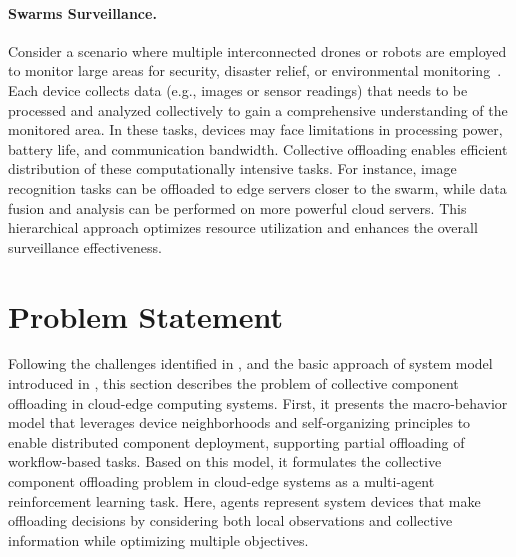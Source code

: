 \paragraph{Swarms Surveillance.} 
Consider a scenario where multiple interconnected drones 
 or robots are employed to monitor large areas for security,
 disaster relief, or environmental monitoring~\cite{DBLP:journals/trob/ChungPDSK18a}.
%
Each device collects data (e.g., images or sensor readings) that needs to be processed 
 and analyzed collectively to gain a comprehensive understanding of the monitored area.
%
In these tasks,
 devices may face limitations in processing power,
 battery life, and communication bandwidth.
%
Collective offloading enables efficient distribution of these computationally intensive tasks.
% 
For instance,
 image recognition tasks can be offloaded to edge servers closer to the swarm, 
 while data fusion and analysis can be performed on more powerful cloud servers.
%
This hierarchical approach optimizes resource utilization 
 and enhances the overall surveillance effectiveness.


\section{Problem Statement}\label{sec:problem-statement}

Following the challenges identified in , 
 and the basic approach of system model introduced in \cite{acsos-model}, 
 this section describes the problem of collective component offloading in cloud-edge computing systems.
%
First, 
 it presents the macro-behavior model that leverages device neighborhoods 
 and self-organizing principles to enable distributed component deployment, 
 supporting partial offloading of workflow-based tasks.
%
Based on this model, 
 it formulates the collective component offloading problem in cloud-edge systems 
 as a multi-agent reinforcement learning task. 
Here, 
 agents represent system devices that make offloading decisions by considering 
 both local observations and collective information while optimizing multiple objectives.


